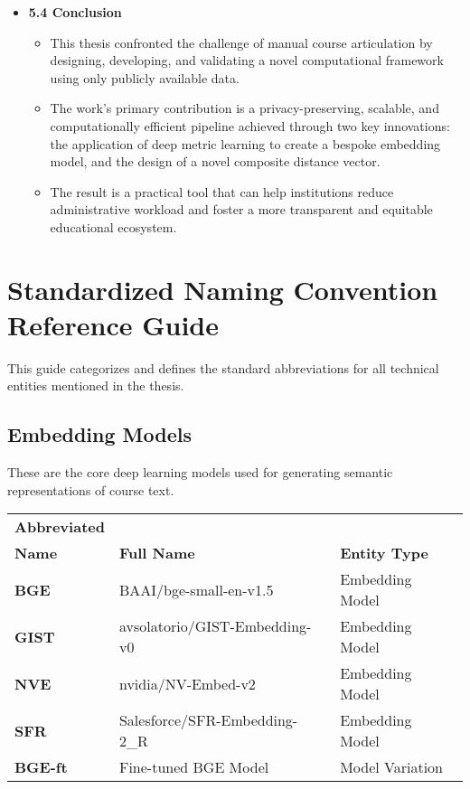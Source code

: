 \documentclass[11pt]{article}
\begin{document}
\begin{itemize}
    \item \textbf{5.4 Conclusion}
    \begin{itemize}
        \item This thesis confronted the challenge of manual course articulation by designing, developing, and validating a novel computational framework using only publicly available data.
        \item The work's primary contribution is a privacy-preserving, scalable, and computationally efficient pipeline achieved through two key innovations: the application of deep metric learning to create a bespoke embedding model, and the design of a novel composite distance vector.
        \item The result is a practical tool that can help institutions reduce administrative workload and foster a more transparent and equitable educational ecosystem.
    \end{itemize}
\end{itemize}

\newpage

\section*{Standardized Naming Convention Reference Guide}
This guide categorizes and defines the standard abbreviations for all technical entities mentioned in the thesis.

\subsection*{Embedding Models}
These are the core deep learning models used for generating semantic representations of course text.
\begin{table}[h!]
\centering
\begin{tabular}{@{}lll@{}}
\toprule
\textbf{Abbreviated} &                                       &          \\ 
\textbf{Name} & \textbf{Full Name}                                      & \textbf{Entity Type}         \\ \midrule
\textbf{BGE}              & BAAI/bge-small-en-v1.5           & Embedding Model      \\
\textbf{GIST}             & avsolatorio/GIST-Embedding-v0      & Embedding Model      \\
\textbf{NVE}              & nvidia/NV-Embed-v2                 & Embedding Model      \\
\textbf{SFR}              & Salesforce/SFR-Embedding-2\_R      & Embedding Model      \\
\textbf{BGE-ft}           & Fine-tuned BGE Model               & Model Variation      \\ \bottomrule
\end{tabular}
\end{table}
\end{document}
